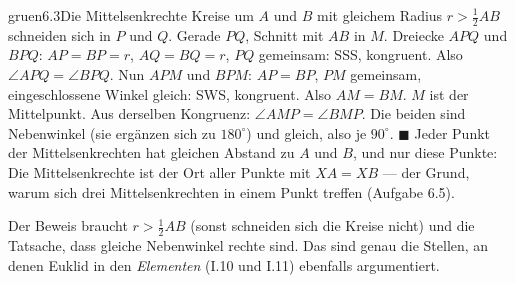 \begin{loesungkarte}{gruen}{6.3}{Die Mittelsenkrechte}
Kreise um $A$ und $B$ mit gleichem Radius $r > \frac12AB$ schneiden sich in $P$ und $Q$. Gerade $PQ$, Schnitt mit $AB$ in $M$.
Dreiecke $APQ$ und $BPQ$: $AP = BP = r$, $AQ = BQ = r$, $PQ$ gemeinsam: SSS, kongruent. Also $\angle APQ = \angle BPQ$. Nun $APM$ und $BPM$: $AP = BP$, $PM$ gemeinsam, eingeschlossene Winkel gleich: SWS, kongruent. Also $AM = BM$. $M$ ist der Mittelpunkt.
Aus derselben Kongruenz: $\angle AMP = \angle BMP$. Die beiden sind Nebenwinkel (sie ergänzen sich zu $180^{\circ}$) und gleich, also je $90^{\circ}$. $\blacksquare$
Jeder Punkt der Mittelsenkrechten hat gleichen Abstand zu $A$ und $B$, und nur diese Punkte: Die Mittelsenkrechte ist der Ort aller Punkte mit $XA = XB$ --- der Grund, warum sich drei Mittelsenkrechten in einem Punkt treffen (Aufgabe 6.5).
\begin{mitnehmen}\kastentext
Der Beweis braucht $r > \frac12AB$ (sonst schneiden sich die Kreise nicht) und die Tatsache, dass gleiche Nebenwinkel rechte sind. Das sind genau die Stellen, an denen Euklid in den \emph{Elementen} (I.10 und I.11) ebenfalls argumentiert.
\end{mitnehmen}
\end{loesungkarte}

